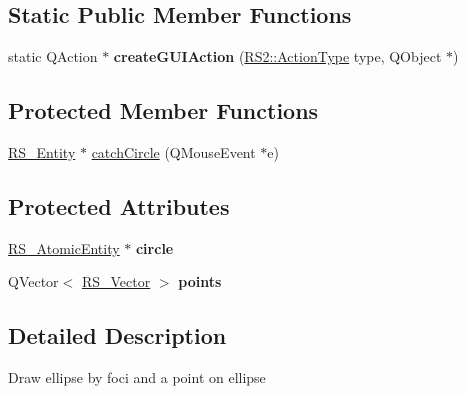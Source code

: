 \subsection*{Static Public Member Functions}
\begin{DoxyCompactItemize}
\item 
\hypertarget{classRS__ActionDrawCircleTan1__2P_a3456148d9785bb288e6917cdaf9ad4fb}{static Q\-Action $\ast$ {\bfseries create\-G\-U\-I\-Action} (\hyperlink{classRS2_afe3523e0bc41fd637b892321cfc4b9d7}{R\-S2\-::\-Action\-Type} type, Q\-Object $\ast$)}\label{classRS__ActionDrawCircleTan1__2P_a3456148d9785bb288e6917cdaf9ad4fb}

\end{DoxyCompactItemize}
\subsection*{Protected Member Functions}
\begin{DoxyCompactItemize}
\item 
\hyperlink{classRS__Entity}{R\-S\-\_\-\-Entity} $\ast$ \hyperlink{classRS__ActionDrawCircleTan1__2P_a8f717155b0a030dda322a0622ecc4f8a}{catch\-Circle} (Q\-Mouse\-Event $\ast$e)
\end{DoxyCompactItemize}
\subsection*{Protected Attributes}
\begin{DoxyCompactItemize}
\item 
\hypertarget{classRS__ActionDrawCircleTan1__2P_a7a9af6274ffa4b6d8c28e79419e0c801}{\hyperlink{classRS__AtomicEntity}{R\-S\-\_\-\-Atomic\-Entity} $\ast$ {\bfseries circle}}\label{classRS__ActionDrawCircleTan1__2P_a7a9af6274ffa4b6d8c28e79419e0c801}

\item 
\hypertarget{classRS__ActionDrawCircleTan1__2P_a55e50c6d8e3c7508a4e98a3607696d1a}{Q\-Vector$<$ \hyperlink{classRS__Vector}{R\-S\-\_\-\-Vector} $>$ {\bfseries points}}\label{classRS__ActionDrawCircleTan1__2P_a55e50c6d8e3c7508a4e98a3607696d1a}

\end{DoxyCompactItemize}


\subsection{Detailed Description}
Draw ellipse by foci and a point on ellipse

